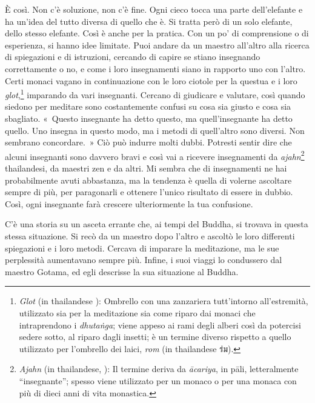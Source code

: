 È così. Non c'è soluzione, non c'è fine. Ogni cieco tocca una parte
dell'elefante e ha un'idea del tutto diversa di quello che è. Si tratta
però di un solo elefante, dello stesso elefante. Così è anche per la
pratica. Con un po' di comprensione o di esperienza, si hanno idee
limitate. Puoi andare da un maestro all'altro alla ricerca di
spiegazioni e di istruzioni, cercando di capire se stiano insegnando
correttamente o no, e come i loro insegnamenti siano in rapporto uno con
l'altro. Certi monaci vagano in continuazione con le loro ciotole per la
questua e i loro \emph{glot},\footnote{\emph{Glot} (in thailandese ):
  Ombrello con una zanzariera tutt'intorno all'estremità, utilizzato sia
  per la meditazione sia come riparo dai monaci che intraprendono i
  \emph{dhutaṅga}; viene appeso ai rami degli alberi così da potercisi
  sedere sotto, al riparo dagli insetti; è un termine diverso rispetto a
  quello utilizzato per l'ombrello dei laici, \emph{rom} (in thailandese
  ร่ม).} imparando da vari insegnanti. Cercano di giudicare e valutare,
così quando siedono per meditare sono costantemente confusi su cosa sia
giusto e cosa sia sbagliato. «~Questo insegnante ha detto questo, ma
quell'insegnante ha detto quello. Uno insegna in questo modo, ma i
metodi di quell'altro sono diversi. Non sembrano concordare.~» Ciò può
indurre molti dubbi. Potresti sentir dire che alcuni insegnanti sono
davvero bravi e così vai a ricevere insegnamenti da
\emph{ajahn}\footnote{\emph{Ajahn} (in thailandese,
  \href{http://www.thai2english.com/dictionary/1453955.html}{}):
  Il termine deriva da \emph{ācariya}, in pāli, letteralmente
  ``insegnante''; spesso viene utilizzato per un monaco o per una monaca
  con più di dieci anni di vita monastica.} thailandesi, da maestri zen
e da altri. Mi sembra che di insegnamenti ne hai probabilmente avuti
abbastanza, ma la tendenza è quella di volerne ascoltare sempre di più,
per paragonarli e ottenere l'unico risultato di essere in dubbio. Così,
ogni insegnante farà crescere ulteriormente la tua confusione.

C'è una storia su un asceta errante che, ai tempi del Buddha, si trovava
in questa stessa situazione. Si recò da un maestro dopo l'altro e
ascoltò le loro differenti spiegazioni e i loro metodi. Cercava di
imparare la meditazione, ma le sue perplessità aumentavano sempre più.
Infine, i suoi viaggi lo condussero dal maestro Gotama, ed egli
descrisse la sua situazione al Buddha.

